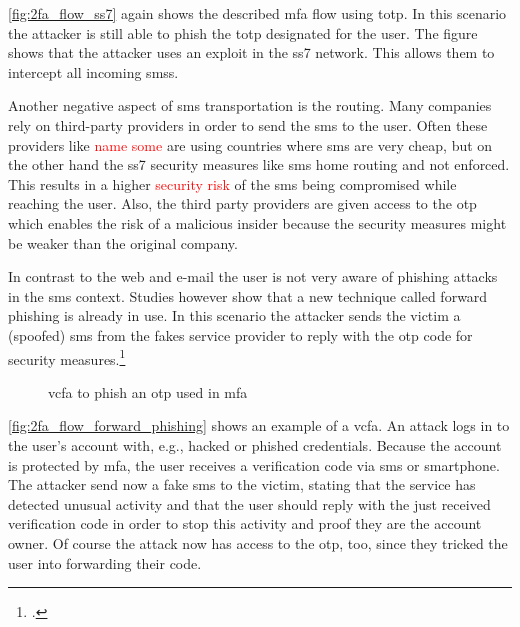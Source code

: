 \autoref{fig:2fa_flow_ss7} again shows the described \gls{mfa} flow using \gls{totp}. In this scenario the attacker is still able to phish the \gls{totp} designated for the user. The figure shows that the attacker uses an exploit in the \gls{ss7} network. This allows them to intercept all incoming \glspl{sms}.

\newpage

Another negative aspect of \gls{sms} transportation is the routing. Many companies rely on third-party providers in order to send the \gls{sms} to the user. Often these providers like \textcolor{red}{name some} are using countries where \gls{sms} are very cheap, but on the other hand the \gls{ss7} security measures like \gls{sms} home routing and not enforced. This results in a higher \textcolor{red}{security risk} of the \gls{sms} being compromised while reaching the user. Also, the third party providers are given access to the \gls{otp} which enables the risk of a malicious insider because the security measures might be weaker than the original company.

In contrast to the web and e-mail the user is not very aware of phishing attacks in the \gls{sms} context. Studies however show that a new technique called forward phishing is already in use. In this scenario the attacker sends the victim a (spoofed) \gls{sms} from the fakes service provider to reply with the \gls{otp} code for security measures.\footcite{JAKOBSSON20186,SIADATI201714}

\begin{figure}[hbt]
	\centering
	
	\caption[\gls{vcfa} to phish an \gls{otp} used in \gls{mfa}]{\gls{vcfa} to phish an \gls{otp} used in \gls{mfa}\footnotemark}
	\label{fig:2fa_flow_forward_phishing}
\end{figure}

\autoref{fig:2fa_flow_forward_phishing} shows an example of a \gls{vcfa}. An attack logs in to the user's account with, e.g., hacked or phished credentials. Because the account is protected by \gls{mfa}, the user receives a verification code via \gls{sms} or smartphone. The attacker send now a fake \gls{sms} to the victim, stating that the service has detected unusual activity and that the user should reply with the just received verification code in order to stop this activity and proof they are the account owner. Of course the attack now has access to the \gls{otp}, too, since they tricked the user into forwarding their code.

